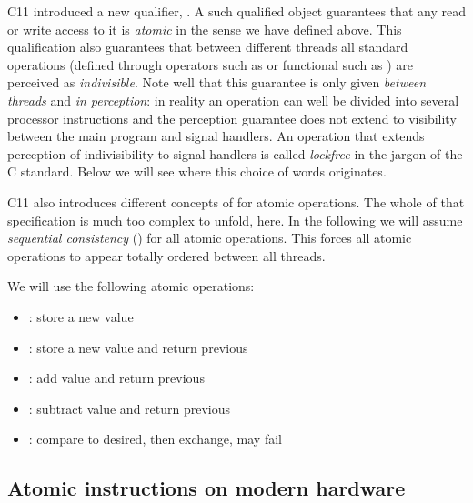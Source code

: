 C11 introduced a new qualifier, . A such qualified object
guarantees that any read or write access to it is \emph{atomic} in the
sense we have defined above. This qualification also guarantees
that between different threads all standard operations (defined
through operators such as \code{+=} or functional such as
) are perceived as \emph{indivisible}. Note well that
this guarantee is only given \emph{between threads} and \emph{in perception}:
in reality an operation can well be divided into several processor
instructions and the perception guarantee does not extend to
visibility between the main program and signal handlers. An
operation that extends perception of indivisibility to signal
handlers is called \emph{lockfree} in the jargon of the C
standard. Below we will see where this choice of words originates.

C11 also introduces different concepts of  for atomic
operations. The whole of that specification is much too complex to
unfold, here. In the following we will assume \emph{sequential
consistency} () for all atomic
operations. This forces all atomic operations to appear totally
ordered between all threads.

We will use the following atomic operations:
\itemadjust
\begin{itemize}
\item[] \hspace*{-3ex}: store a new value
\itemadjust
\item[] \hspace*{-3ex}: store a new value and
 return previous
\itemadjust
\item[] \hspace*{-3ex}: add value and
 return previous
\itemadjust
\item[] \hspace*{-3ex}: subtract value and
 return previous
\itemadjust
\item[] \hspace*{-3ex}: compare to desired, then
  exchange, may fail
\end{itemize}
\fi



\subsection{Atomic instructions on modern hardware}
\label{sec-2-2}

